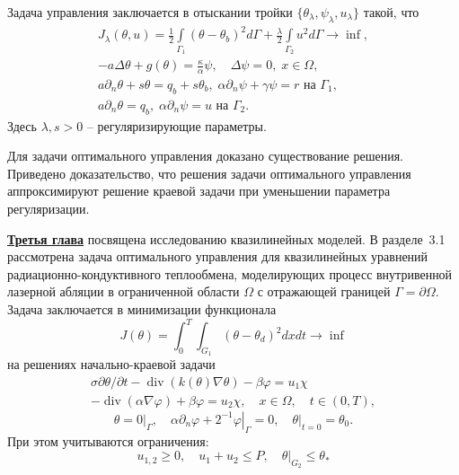 Задача управления заключается
в отыскании тройки $\{\theta_\lambda,\psi_\lambda,u_\lambda\}$ такой, что
\begin{gather}
    \label{eq:2_4:cost}
    J_\lambda(\theta, u) =
    \frac{1}{2} \int \limits_{\Gamma_1} (\theta - \theta_b)^2 d \Gamma
    + \frac{\lambda}{2}\int\limits_{\Gamma_2} u^2 d\Gamma \rightarrow \inf, \\
    - a \Delta \theta + g (\theta) = \frac{\kappa}{\alpha}\psi, \quad
    \Delta \psi = 0, \; x \in \Omega, \\
    a \partial_n \theta + s \theta = q_b + s \theta_b,
    \; \alpha \partial_n \psi + \gamma \psi = r
    \text{ на } \Gamma_1,\\
    a \partial_n \theta = q_b, \;
    \alpha \partial_n \psi = u \text{ на } \Gamma_2.
\end{gather}
Здесь $\lambda, s > 0$ -- регуляризирующие параметры.


Для задачи оптимального управления доказано существование решения.
Приведено доказательство, что решения задачи оптимального управления
аппроксимируют решение краевой задачи при уменьшении параметра регуляризации.


\underline{\textbf{Третья глава}} посвящена исследованию квазилинейных моделей.
В разделе~3.1 рассмотрена задача оптимального управления для
квазилинейных уравнений радиационно-кондуктивного
теплообмена, моделирующих процесс внутривенной
лазерной абляции в ограниченной области $\Omega$ с отражающей границей $\Gamma=\partial\Omega$.
Задача заключается в минимизации функционала
\[ J(\theta)=\int_{0}^{T} \int_{G_{1}}\left(\theta-\theta_{d}\right)^{2} dx dt \rightarrow \inf \]
на решениях начально-краевой задачи
\begin{equation}
    \label{eq:3_2:1}
    \begin{gathered}
        \sigma \partial \theta / \partial t-\operatorname{div}(k(\theta)
        \nabla \theta)-\beta \varphi=u_{1} \chi \\
        -\operatorname{div}(\alpha \nabla \varphi)+\beta \varphi=u_{2}
        \chi, \quad x \in \Omega, \quad t \in(0, T),
    \end{gathered}
\end{equation}
\begin{equation}
    \label{eq:3_2:2}
    \theta=\left.0\right|_{\Gamma},
    \quad \alpha \partial_{n} \varphi
    +\left.2^{-1} \varphi\right|_{\Gamma}=0,
    \left.\quad \theta\right|_{t=0}=\theta_{0}.
\end{equation}
При этом учитываются ограничения:
\begin{equation}
    \label{eq:3_2:3}
    u_{1,2} \geq 0, \quad u_{1}+u_{2} \leq P, \left.\quad \theta\right|_{G_{2}} \leq \theta_{*}
\end{equation}


